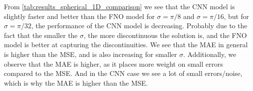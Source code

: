 From \autoref{tab:results_spherical_1D_comparison} we see that the CNN model is slightly faster and better than the FNO model for $\sigma = \pi/8$ and $\sigma = \pi/16$, but for $\sigma = \pi/32$, the performance of the CNN model is decreasing.
Probably due to the fact that the smaller the $\sigma$, the more discontinuous the solution is, and the FNO model is better at capturing the discontinuities.
We see that the MAE in general is higher than the MSE, and is also increasing for smaller $\sigma$.
Additionally, we observe that the MAE is higher, as it places more weight on small errors compared to the MSE.
And in the CNN case we see a lot of small errors/noise, which is why the MAE is higher than the MSE.


